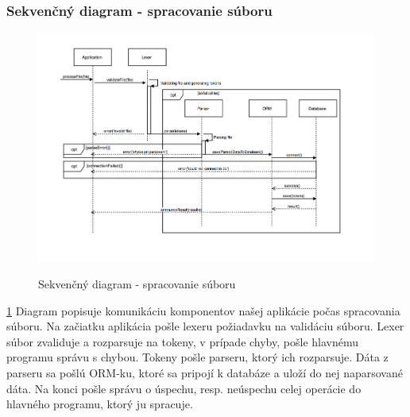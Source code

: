 \documentclass[12pt,a4paper]{article}
\begin{document}
\subsubsection{Sekvenčný diagram - spracovanie súboru}
\begin{figure}[H]
	\caption{Sekvenčný diagram - spracovanie súboru}
	\includegraphics[width=\textwidth]{sequence_file}
	\label{fig:seq}
\end{figure}
\ref{fig:seq}
Diagram popisuje komunikáciu komponentov našej aplikácie počas spracovania súboru. Na začiatku aplikácia pošle lexeru požiadavku na validáciu súboru. Lexer súbor zvaliduje a rozparsuje na tokeny, v prípade chyby, pošle hlavnému programu správu s chybou. Tokeny pošle parseru, ktorý ich rozparsuje. Dáta z parseru sa pošlú ORM-ku, ktoré sa pripojí k databáze a uloží do nej naparsované dáta. Na konci pošle správu o úspechu, resp. neúspechu celej operácie do hlavného programu, ktorý ju spracuje.
\end{document}
